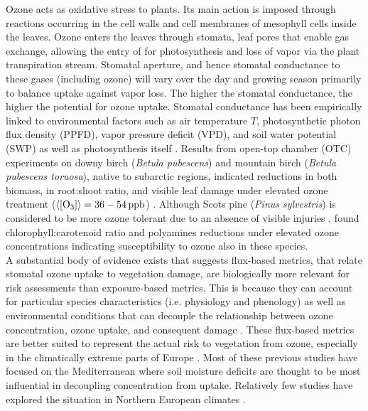 \documentclass[bg, manuscript]{copernicus}
\begin{document}
Ozone acts as oxidative stress to plants. Its main action is imposed through reactions occurring in the cell walls and cell membranes of mesophyll cells inside the leaves. Ozone enters the leaves through stomata, leaf pores that enable gas exchange, allowing the entry of  for photosynthesis and loss of  vapor via the plant transpiration stream. Stomatal aperture, and hence stomatal conductance to these gases (including ozone) will vary over the day and growing season primarily to balance  uptake against  vapor loss. The higher the stomatal conductance, the higher the potential for ozone uptake. Stomatal conductance has been empirically linked to environmental factors such as air temperature $T$, photosynthetic photon flux density (PPFD), vapor pressure deficit (VPD), and soil water potential (SWP) as well as photosynthesis itself \cite[e.g.]{PTRS:Jarvis1976, BallBerry1987, Emberson2000, ICP:MappingManual2017}. Results from open-top chamber (OTC) experiments on downy birch (\emph{Betula pubescens}) and mountain birch (\emph{Betula pubescens toruosa}), native to subarctic regions, indicated reductions in both biomass, in root:shoot ratio, and visible leaf damage under elevated ozone treatment ($\left<\chem{[O_3]}\right> = 36-54\,\unit{ppb}$) \citep{Amb:Manninen2009}. Although Scots pine (\emph{Pinus sylvestris}) is considered to be more ozone tolerant due to an absence of visible injuries \citep{Amb:Girgzdiene2009}, \citet{Amb:Manninen2009} found chlorophyll:carotenoid ratio and polyamines reductions under elevated ozone concentrations indicating susceptibility to ozone also in these species.\\

A substantial body of evidence exists that suggests flux-based metrics, that relate stomatal ozone uptake to vegetation damage, are biologically more relevant for risk assessments than exposure-based metrics. This is because they can account for particular species characteristics (i.e. physiology and phenology) as well as environmental conditions that can decouple the relationship between ozone concentration, ozone uptake, and consequent damage \citep{PT:Emberson2020}. These flux-based metrics are better suited to represent the actual risk to vegetation from ozone, especially in the climatically extreme parts of Europe \citep{EP:Simpson2007,GCB:Mills2011,ICP:MappingManual2017}. Most of these previous studies have focused on the Mediterranean where soil moisture deficits are thought to be most influential in decoupling concentration from uptake. Relatively few studies have explored the situation in Northern European climates \citep[e.g.][]{iF:Juran2018}.
\end{document}

